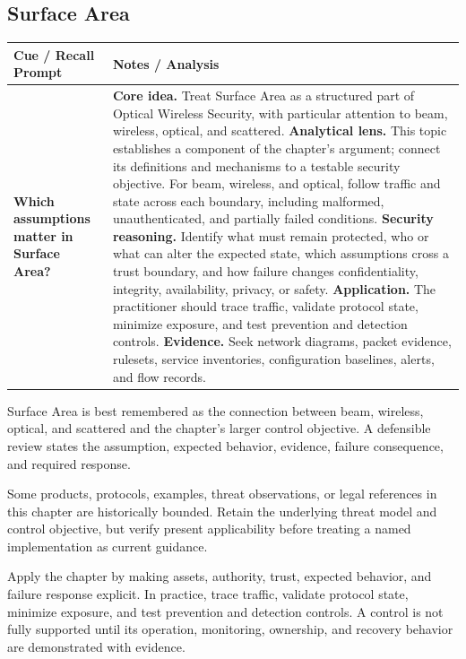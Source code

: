 \documentclass[11pt]{article}
\newcommand{\CornellHeader}{%
\rowcolor{Navy}\color{white}\bfseries Cue / Recall Prompt & \color{white}\bfseries Notes / Analysis\\\hline}
\newcommand{\CornellRow}[2]{%
\cellcolor{CueGray}\RaggedRight\textbf{#1} & \RaggedRight #2\\\hline}
\begin{document}
\subsection*{Surface Area}
\begin{longtable}{>{\RaggedRight\arraybackslash}p{}|>{\RaggedRight\arraybackslash}p{}}
\CornellHeader
\CornellRow{Which assumptions matter in Surface Area?}{\textbf{Core idea.} Treat Surface Area as a structured part of Optical Wireless Security, with particular attention to beam, wireless, optical, and scattered. \textbf{Analytical lens.} This topic establishes a component of the chapter's argument; connect its definitions and mechanisms to a testable security objective. For beam, wireless, and optical, follow traffic and state across each boundary, including malformed, unauthenticated, and partially failed conditions. \textbf{Security reasoning.} Identify what must remain protected, who or what can alter the expected state, which assumptions cross a trust boundary, and how failure changes confidentiality, integrity, availability, privacy, or safety. \textbf{Application.} The practitioner should trace traffic, validate protocol state, minimize exposure, and test prevention and detection controls. \textbf{Evidence.} Seek network diagrams, packet evidence, rulesets, service inventories, configuration baselines, alerts, and flow records.}
\end{longtable}
\begin{topicsummary}
Surface Area is best remembered as the connection between beam, wireless, optical, and scattered and the chapter's larger control objective. A defensible review states the assumption, expected behavior, evidence, failure consequence, and required response.
\end{topicsummary}
\begin{historybox}
Some products, protocols, examples, threat observations, or legal references in this chapter are historically bounded. Retain the underlying threat model and control objective, but verify present applicability before treating a named implementation as current guidance.
\end{historybox}
\begin{defensebox}
Apply the chapter by making assets, authority, trust, expected behavior, and failure response explicit. In practice, trace traffic, validate protocol state, minimize exposure, and test prevention and detection controls. A control is not fully supported until its operation, monitoring, ownership, and recovery behavior are demonstrated with evidence.
\end{defensebox}
\end{document}
